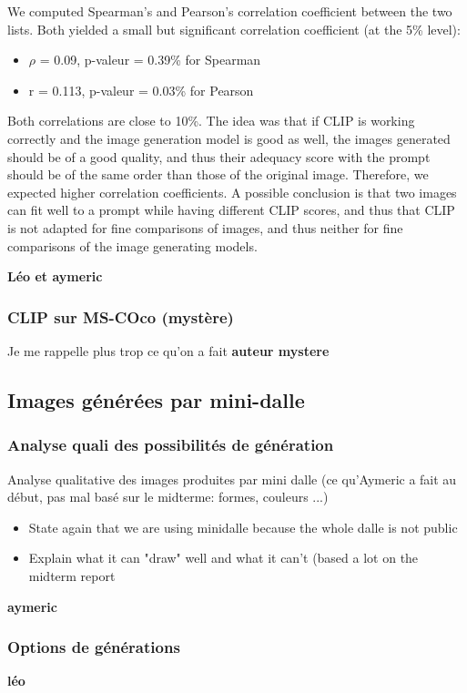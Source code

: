 \documentclass{article}
\begin{document}
We computed Spearman's and Pearson's correlation coefficient between the two lists. Both yielded a small but significant correlation coefficient (at the 5\% level):
\begin{itemize}
    \item $\rho$ = 0.09, p-valeur = 0.39\% for Spearman
    \item r = 0.113, p-valeur = 0.03\% for Pearson
\end{itemize}
Both correlations are close to 10\%. The idea was that if CLIP is working correctly and the image generation model is good as well, the images generated should be of a good quality, and thus their adequacy score with the prompt should be of the same order than those of the original image. Therefore, we expected higher correlation coefficients. 
A possible conclusion is that two images can fit well to a prompt while having different CLIP scores, and thus that CLIP is not adapted for fine comparisons of images, and thus neither for fine comparisons of the image generating models. 


\textbf{Léo et aymeric}

\subsubsection{CLIP sur MS-COco (mystère)}
Je me rappelle plus trop ce qu'on a fait
\textbf{auteur mystere}

\subsection{Images générées par mini-dalle}

\subsubsection{Analyse quali des possibilités de génération}
Analyse qualitative des images produites par mini dalle (ce qu'Aymeric a fait au début, pas mal basé sur le midterme: formes, couleurs ...)

\begin{itemize}
    \item State again that we are using minidalle because the whole dalle is not public
    \item Explain what it can "draw" well and what it can't (based a lot on the midterm report
\end{itemize}
\textbf{aymeric}

\subsubsection{Options de générations}
\textbf{léo}
\end{document}
